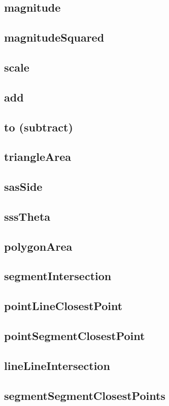 \documentclass[a4paper]{article}
\begin{document}
\subsection{magnitude}
\subsection{magnitudeSquared}
\subsection{scale}
\subsection{add}
\subsection{to (subtract)}
\subsection{triangleArea}
\subsection{sasSide}
\subsection{sssTheta}
\subsection{polygonArea}
\subsection{segmentIntersection}
\subsection{pointLineClosestPoint}
\subsection{pointSegmentClosestPoint}
\subsection{lineLineIntersection}
\subsection{segmentSegmentClosestPoints}
\end{document}
